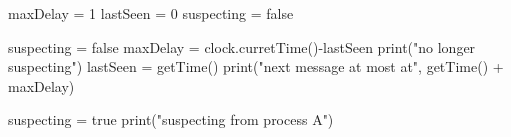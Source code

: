 \documentclass[12pt,a4paper]{report}
\begin{document}
\begin{enumerate}
{			\begin{algorithmic}[1]
				\Initially
				 	\State maxDelay = 1
					\State lastSeen = 0
					\State suspecting = false
				\EndInitially
				\Statex

						\State suspecting = false
						\State maxDelay = clock.curretTime()-lastSeen
						\State print("no longer suspecting")
					\EndIf
					\State lastSeen = getTime()
					\State print("next message at most at", getTime() + maxDelay)
				\EndUpon
				\Statex

					\State suspecting = true
					\State print("suspecting from process A")
				\EndUpon
			\end{algorithmic}
		}
	\end{enumerate}
\end{document}
